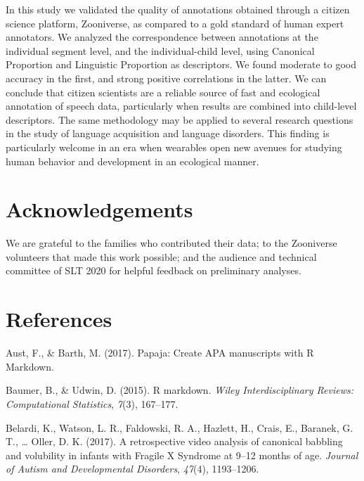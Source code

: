 \documentclass[english,,man]{apa6}
\begin{document}
In this study we validated the quality of annotations obtained through a citizen science platform, Zooniverse, as compared to a gold standard of human expert annotators. We analyzed the correspondence between annotations at the individual segment level, and the individual-child level, using Canonical Proportion and Linguistic Proportion as descriptors. We found moderate to good accuracy in the first, and strong positive correlations in the latter. We can conclude that citizen scientists are a reliable source of fast and ecological annotation of speech data, particularly when results are combined into child-level descriptors. The same methodology may be applied to several research questions in the study of language acquisition and language disorders. This finding is particularly welcome in an era when wearables open new avenues for studying human behavior and development in an ecological manner.

\newpage

\hypertarget{acknowledgements}{%
\section{Acknowledgements}\label{acknowledgements}}

We are grateful to the families who contributed their data; to the Zooniverse volunteers that made this work possible; and the audience and technical committee of SLT 2020 for helpful feedback on preliminary analyses.

\hypertarget{references}{%
\section{References}\label{references}}

\setlength{\parindent}{-0.5in}
\setlength{\leftskip}{0.5in}

\hypertarget{refs}{}
\leavevmode\hypertarget{ref-aust2017papaja}{}%
Aust, F., \& Barth, M. (2017). Papaja: Create APA manuscripts with R Markdown.

\leavevmode\hypertarget{ref-baumer2015r}{}%
Baumer, B., \& Udwin, D. (2015). R markdown. \emph{Wiley Interdisciplinary Reviews: Computational Statistics}, \emph{7}(3), 167--177.

\leavevmode\hypertarget{ref-belardi2017retrospective}{}%
Belardi, K., Watson, L. R., Faldowski, R. A., Hazlett, H., Crais, E., Baranek, G. T., \ldots{} Oller, D. K. (2017). A retrospective video analysis of canonical babbling and volubility in infants with Fragile X Syndrome at 9--12 months of age. \emph{Journal of Autism and Developmental Disorders}, \emph{47}(4), 1193--1206.
\end{document}

